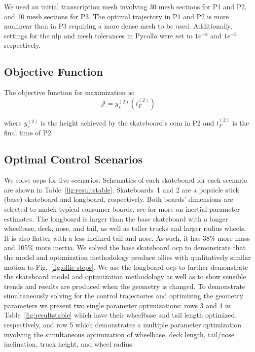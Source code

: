 \documentclass[default,iicol]{sn-jnl}
\begin{document}
We used an initial transcription mesh involving 30 mesh sections for P1 and P2, and 10 mesh sections for P3. The optimal trajectory in P1 and P2 is more nonlinear than in P3 requiring a more dense mesh to be used.
Additionally, settings for the \gls{nlp} and mesh tolerances in Pycollo were set to $1e^{-8}$ and $1e^{-3}$ respectively.

\subsection{Objective Function}

The objective function for maximization is:
%
\begin{equation}
  \mathcal{J} = y_s^{(2)}\left(t_F^{(2)}\right)
\end{equation}

\noindent where $y_s^{(2)}$ is the height achieved by the skateboard's \gls{com} in P2 and $t_F^{(2)}$ is the final time of P2.

\subsection{Optimal Control Scenarios}
%
We solve \glspl{ocp} for five scenarios. Schematics of each skateboard for each scenario are shown in Table~\ref{fig:resultstable}. Skateboards~1 and 2 are a popsicle stick (base) skateboard and longboard, respectively. Both boards' dimensions are selected to match typical consumer boards, see \cite{heinen_optimal_2022} for more on inertial parameter estimates. 
The longboard is larger than the base skateboard with a longer wheelbase, deck, nose, and tail, as well as taller trucks and larger radius wheels. It is also flatter with a less inclined tail and nose. As such, it has 38\% more mass and 105\% more inertia.
We solved the base skateboard \gls{ocp} to demonstrate that the model and optimization methodology produce ollies with qualitatively similar motion to Fig.~\ref{fig:ollie steps}.
We use the longboard \gls{ocp} to further demonstrate the skateboard model and optimization methodology as well as to show sensible trends and results are produced when the geometry is changed.
To demonstrate simultaneously solving for the control trajectories and optimizing the geometry parameters we present two single parameter optimizations: rows 3 and 4 in Table~\ref{fig:resultstable} which have their wheelbase and tail length optimized, respectively, and row 5 which demonstrates a multiple parameter optimization involving the simultaneous optimization of wheelbase, deck length, tail/nose inclination, truck height, and wheel radius.
\end{document}
